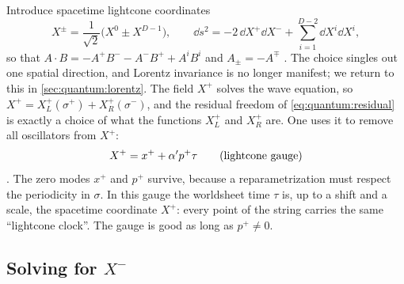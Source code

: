 Introduce spacetime lightcone coordinates
\begin{equation}\label{eq:quantum:lc}
 X^\pm=\frac{1}{\sqrt2}\big(X^0\pm X^{D-1}\big),\qquad
 \dd s^2=-2\,\dd X^+\dd X^-+\sum_{i=1}^{D-2}\dd X^i\dd X^i,
\end{equation}
so that $A\cdot B=-A^+B^--A^-B^++A^iB^i$ and $A_\pm=-A^\mp$
. The choice singles out one spatial direction, and
Lorentz invariance is no longer manifest; we return to this in
\cref{sec:quantum:lorentz}. The field $X^+$ solves the wave equation, so
$X^+=X^+_L(\sigma^+)+X^+_R(\sigma^-)$, and the residual freedom of \cref{eq:quantum:residual} is
exactly a choice of what the functions $X_L^+$ and $X_R^+$ are. One uses it to remove all
oscillators from $X^+$:
\begin{equation}\label{eq:quantum:lcgauge}
 X^+=x^++\alpha' p^+\tau\qquad\text{(lightcone gauge)}
\end{equation}
. The zero modes $x^+$ and $p^+$
survive, because a reparametrization must respect the periodicity in $\sigma$. In this
gauge the worldsheet time $\tau$ is, up to a shift and a scale, the spacetime coordinate
$X^+$: every point of the string carries the same ``lightcone clock''. The gauge is good as long as $p^+\neq0$.

\subsection{Solving for \texorpdfstring{$X^-$}{X-}}

